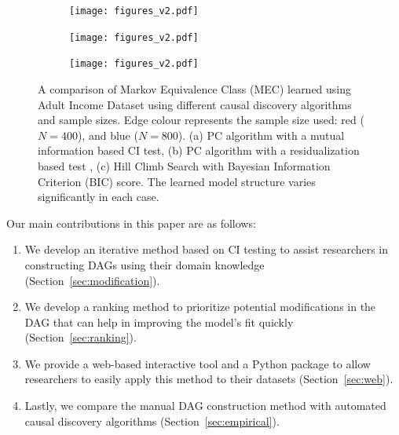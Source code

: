 \documentclass{uai2025} %
\begin{document}
\begin{figure}[t!]
    \begin{subfigure}{0.5 \textwidth}
	\centering
    	\texttt{[image: figures\_v2.pdf]}
    	\caption{}
    \end{subfigure}
    \begin{subfigure}{0.5\textwidth}
	\centering
    	\texttt{[image: figures\_v2.pdf]}
    	\caption{}
    \end{subfigure}
    \begin{subfigure}{0.5\textwidth}
	\centering
    	\texttt{[image: figures\_v2.pdf]}
    	\caption{}
    \end{subfigure}

    \caption{A comparison of Markov Equivalence Class (MEC) learned using Adult
	     Income Dataset \citep{Becker1996} using different causal discovery
	     algorithms and sample sizes. Edge colour represents the sample size
	     used: red ($N=400$), and blue ($N=800$). (a) PC algorithm with a
	     mutual information based CI test, (b) PC algorithm with a
    	     residualization based test \citep{Ankan2023}, (c) Hill Climb Search with
	     Bayesian Information Criterion (BIC) score. The learned model structure varies
             significantly in each case.}
    \label{fig:intro}
\end{figure}


Our main contributions in this paper are as follows:

\begin{enumerate}
    \item We develop an iterative method based on CI testing to assist researchers in 
	    constructing DAGs using their domain knowledge (Section~\ref{sec:modification}).
    \item We develop a ranking method to prioritize potential modifications in the DAG that 
    	    can help in improving the model's fit quickly (Section~\ref{sec:ranking}).
    \item We provide a web-based interactive tool and a Python package to allow 
	    researchers to easily apply this method to their datasets (Section~\ref{sec:web}).
    \item Lastly, we compare the manual DAG construction method with automated
	    causal discovery algorithms (Section~\ref{sec:empirical}).
\end{enumerate}
\end{document}
